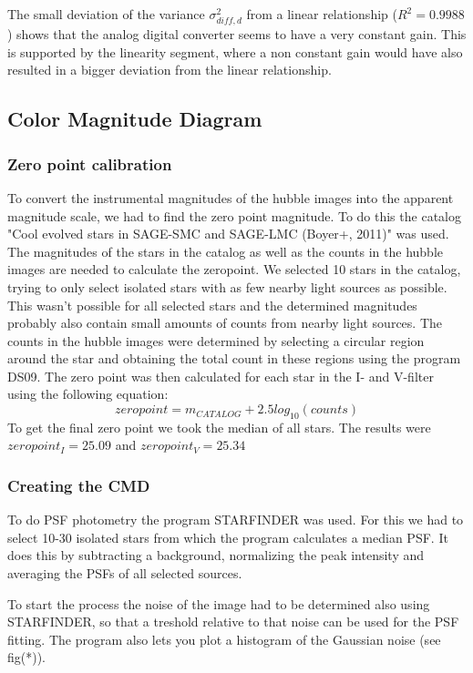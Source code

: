 \documentclass[12pt]{article}
\begin{document}
The small deviation of the variance $\sigma_{diff,d}^2$ from a linear relationship ($R^2=0.9988$) shows that the analog digital converter seems to have a very constant gain. This is supported by the linearity segment, where a non constant gain would have also resulted in a bigger deviation from the linear relationship. 

\subsection{Color Magnitude Diagram}
\subsubsection{Zero point calibration}
To convert the instrumental magnitudes of the hubble images into  the apparent magnitude scale, we had to find the zero point magnitude. To do this the catalog "Cool evolved stars in SAGE-SMC and SAGE-LMC (Boyer+, 2011)" was used. The magnitudes of the stars in the catalog as well as the counts in the hubble images are needed to calculate the zeropoint. We selected 10 stars in the catalog, trying to only select isolated stars with as few nearby light sources as possible. This wasn't possible for all selected stars and the determined magnitudes probably also contain small amounts of counts from nearby light sources. The counts in the hubble images were determined by selecting a circular region around the star and obtaining the total count in these regions using the program DS09. The zero point was then calculated for each star in the I- and V-filter using the following equation:
\begin{equation}
zeropoint=m_{CATALOG}+2.5log_{10}(counts)
\end{equation}
To get the final zero point we took the median of all stars. The results were $zeropoint_I=25.09$ and $zeropoint_V=25.34$ 

\subsubsection{Creating the CMD}
To do PSF photometry the program STARFINDER was used. For this we had to select 10-30 isolated stars from which the program calculates a median PSF. It does this by subtracting a background, normalizing the peak intensity and averaging the PSFs of all selected sources. 

To start the process the noise of the image had to be determined also using STARFINDER, so that a treshold relative to that noise can be used for the PSF fitting. The program also lets you plot a histogram of the Gaussian noise (see fig(*)). 
\end{document}

